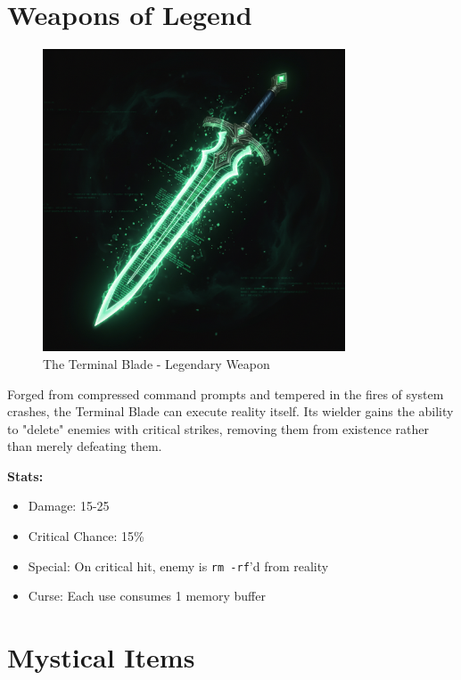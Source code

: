 \documentclass[11pt,a4paper]{book}
\begin{document}
\section{Weapons of Legend}

\begin{figure}[H]
    \centering
    \includegraphics[width=0.8\textwidth]{images/terminal-blade.png}
    \caption{The Terminal Blade - Legendary Weapon}
\end{figure}

\begin{lorebox}
Forged from compressed command prompts and tempered in the fires of system crashes, the Terminal Blade can execute reality itself. Its wielder gains the ability to "delete" enemies with critical strikes, removing them from existence rather than merely defeating them.

\textbf{Stats:}
\begin{itemize}
    \item Damage: 15-25
    \item Critical Chance: 15\%
    \item Special: On critical hit, enemy is \texttt{rm -rf}'d from reality
    \item Curse: Each use consumes 1 memory buffer
\end{itemize}
\end{lorebox}

\section{Mystical Items}
\end{document}
